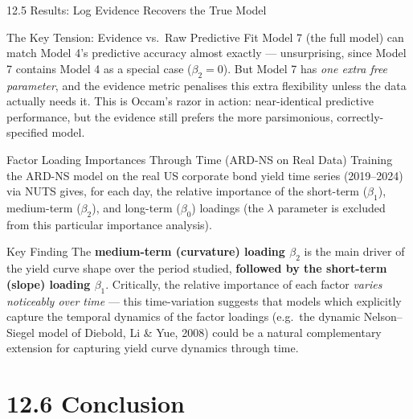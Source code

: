 \documentclass[aspectratio=169,10pt]{beamer}
\begin{document}
\begin{frame}[allowframebreaks]{12.5 Results: Log Evidence Recovers the True Model}
\begin{exampleblock}{The Key Tension: Evidence vs.\ Raw Predictive Fit}
Model 7 (the full model) can match Model 4's predictive accuracy almost exactly --- unsurprising, since Model 7 contains Model 4 as a special case ($\beta_2=0$). But Model 7 has \emph{one extra free parameter}, and the evidence metric penalises this extra flexibility unless the data actually needs it. This is Occam's razor in action: near-identical predictive performance, but the evidence still prefers the more parsimonious, correctly-specified model.
\end{exampleblock}

\framebreak

\begin{block}{Factor Loading Importances Through Time (ARD-NS on Real Data)}
Training the ARD-NS model on the real US corporate bond yield time series (2019--2024) via NUTS gives, for each day, the relative importance of the short-term ($\beta_1$), medium-term ($\beta_2$), and long-term ($\beta_0$) loadings (the $\lambda$ parameter is excluded from this particular importance analysis).
\end{block}

\begin{alertblock}{Key Finding}
The \textbf{medium-term (curvature) loading $\beta_2$} is the main driver of the yield curve shape over the period studied, \textbf{followed by the short-term (slope) loading $\beta_1$}. Critically, the relative importance of each factor \emph{varies noticeably over time} --- this time-variation suggests that models which explicitly capture the temporal dynamics of the factor loadings (e.g.\ the dynamic Nelson--Siegel model of Diebold, Li \& Yue, 2008) could be a natural complementary extension for capturing yield curve dynamics through time.
\end{alertblock}

\end{frame}

\section{12.6 Conclusion}
\end{document}
